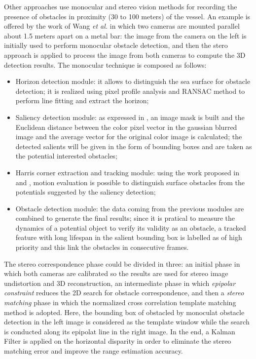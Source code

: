 \documentclass[journal]{IEEEtran}
\begin{document}
      \indent Other approaches use monocular and stereo vision methods for recording the presence of obstacles in proximity (30 to 100 meters) of the vessel. An example is offered by the work of Wang \textit{et al.} \cite{Wang2011,Wang2012} in which two cameras are mounted parallel about 1.5 meters apart on a metal bar: the image from the camera on the left is initially used to perform monocular obstacle detection, and then the stero approach is applied to process the image from both cameras to compute the 3D detection results. The monocular technique is composed as follows:
            \begin{itemize}
                  \item Horizon detection module: it allows to distinguish the sea surface for obstacle detection; it is realized using pixel profile analysis and RANSAC method to perform line fitting and extract the horizon;
                  \item Saliency detection module: as expressed in \cite{Achanta2009}, an image mask is built and the Euclidean distance between the color pixel vector in the gaussian blurred image and the average vector for the original color image is calculated; the detected salients will be given in the form of bounding boxes and are taken as the potential interested obstacles;
                  \item Harris corner extraction and tracking module: using the work proposed in \cite{Harris1988} and \cite{Bouguet1999}, motion evaluation is possible to distinguish surface obstacles from the potentials suggested by the saliency detection;
                  \item Obstacle detection module: the data coming from the previous modules are combined to generate the final results; since it is pratical to measure the dynamics of a potential object to verify its validity as an obstacle, a tracked feature with long lifespan in the salient bounding box is labelled as of high priority and this link the obstacles in consecutive frames.
            \end{itemize}
      \indent The stereo correspondence phase could be divided in three: an initial phase in which both cameras are calibrated so the results are used for stereo image undistortion and 3D reconstruction, an intermediate phase in which \textit{epipolar constraint} reduces the 2D search for obstacle correspondence, and then a \textit{stereo matching} phase in which the normalized cross correlation template matching method is adopted. Here, the bounding box of obstacled by monoculat obstacle detection in the left image is considered as the template window while the search is conducted along its epipolat line in the right image. In the end, a Kalman Filter is applied on the horizontal disparity in order to eliminate the stereo matching error and improve the range estimation accuracy.\\
\end{document}
